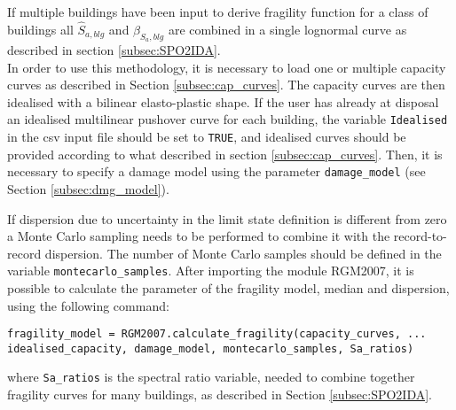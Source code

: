 If multiple buildings have been input to derive fragility function for a class of buildings all $\hat{S}_{a, blg}$ and $\beta_{S_a, blg}$ are combined in a single lognormal curve as described in section \ref{subsec:SPO2IDA}.\\

In order to use this methodology, it is necessary to load one or multiple capacity curves as described in Section \ref{subsec:cap_curves}. The capacity curves are then idealised with a bilinear elasto-plastic shape. If the user has already at disposal an idealised multilinear pushover curve for each building, the variable \verb=Idealised= in the csv input file should be set to \verb=TRUE=, and idealised curves should be provided according to what described in section \ref{subsec:cap_curves}. Then, it is necessary to specify a damage model using the parameter \verb=damage_model= (see Section \ref{subsec:dmg_model}).

If dispersion due to uncertainty in the limit state definition is different from zero a Monte Carlo sampling needs to be performed to combine it with the record-to-record dispersion. The number of Monte Carlo samples should be defined in the variable \verb=montecarlo_samples=.
After importing the module RGM2007, it is possible to calculate the parameter of the fragility model, median and dispersion, using the following command:

\begin{Verbatim}[frame=single, commandchars=\\\{\}, samepage=true]
fragility_model = RGM2007.calculate_fragility(capacity_curves, ...
idealised_capacity, damage_model, montecarlo_samples, Sa_ratios)
\end{Verbatim}

where \verb=Sa_ratios= is the spectral ratio variable, needed to combine together fragility curves for many buildings, as described in Section \ref{subsec:SPO2IDA}.